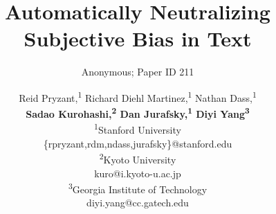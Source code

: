 \newcommand{\citet}[1]{\citeauthor{#1}~\shortcite{#1}}
\newcommand{\citep}{\cite}
\newcommand{\citealp}[1]{\citeauthor{#1}~\citeyear{#1}}
\usepackage{enumitem}


\usepackage{amsmath}
\usepackage{verbatim}

\setcounter{secnumdepth}{2} %

%
\setlength\titlebox{2.5in} %
\title{Automatically Neutralizing Subjective Bias in Text }
\author{Anonymous; Paper ID 211}
\author{Reid Pryzant,\textsuperscript{\rm 1} Richard Diehl Martinez,\textsuperscript{\rm 1} Nathan Dass,\textsuperscript{\rm 1}\\ \Large \textbf{Sadao Kurohashi,\textsuperscript{\rm 2} Dan Jurafsky,\textsuperscript{\rm 1} Diyi Yang\textsuperscript{\rm 3}} \\
\textsuperscript{\rm 1}Stanford University \\  \{rpryzant,rdm,ndass,jurafsky\}@stanford.edu \\
\textsuperscript{\rm 2}Kyoto University\\ kuro@i.kyoto-u.ac.jp \\
\textsuperscript{\rm 3}Georgia Institute of Technology\\
diyi.yang@cc.gatech.edu \\
}
 


\maketitle

